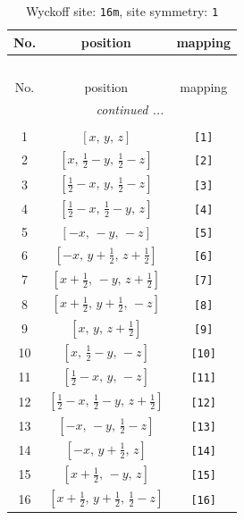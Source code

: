 \documentclass[fleqn,8pt]{jsarticle}
\begin{document}
\begin{longtable}{ccc}
\caption{Wyckoff site: {\tt 16m}, site symmetry: {\tt 1}}
 \\
 \hline \hline
No. & position & mapping \\ \hline \endfirsthead

\multicolumn{2}{l}{\tablename\ \thetable{}} \\
 \hline \hline
No. & position & mapping \\ \hline \endhead

 \hline \hline
\multicolumn{2}{r}{\footnotesize\it continued ...} \\ \endfoot

 \hline \hline
\multicolumn{2}{r}{} \\ \endlastfoot

1 & $\left[ x,\, y,\, z \right]$ & {\tt [1]} \\ \hline
2 & $\left[ x,\, \frac{1}{2} - y,\, \frac{1}{2} - z \right]$ & {\tt [2]} \\ \hline
3 & $\left[ \frac{1}{2} - x,\, y,\, \frac{1}{2} - z \right]$ & {\tt [3]} \\ \hline
4 & $\left[ \frac{1}{2} - x,\, \frac{1}{2} - y,\, z \right]$ & {\tt [4]} \\ \hline
5 & $\left[ - x,\, - y,\, - z \right]$ & {\tt [5]} \\ \hline
6 & $\left[ - x,\, y + \frac{1}{2},\, z + \frac{1}{2} \right]$ & {\tt [6]} \\ \hline
7 & $\left[ x + \frac{1}{2},\, - y,\, z + \frac{1}{2} \right]$ & {\tt [7]} \\ \hline
8 & $\left[ x + \frac{1}{2},\, y + \frac{1}{2},\, - z \right]$ & {\tt [8]} \\ \hline
9 & $\left[ x,\, y,\, z + \frac{1}{2} \right]$ & {\tt [9]} \\ \hline
10 & $\left[ x,\, \frac{1}{2} - y,\, - z \right]$ & {\tt [10]} \\ \hline
11 & $\left[ \frac{1}{2} - x,\, y,\, - z \right]$ & {\tt [11]} \\ \hline
12 & $\left[ \frac{1}{2} - x,\, \frac{1}{2} - y,\, z + \frac{1}{2} \right]$ & {\tt [12]} \\ \hline
13 & $\left[ - x,\, - y,\, \frac{1}{2} - z \right]$ & {\tt [13]} \\ \hline
14 & $\left[ - x,\, y + \frac{1}{2},\, z \right]$ & {\tt [14]} \\ \hline
15 & $\left[ x + \frac{1}{2},\, - y,\, z \right]$ & {\tt [15]} \\ \hline
16 & $\left[ x + \frac{1}{2},\, y + \frac{1}{2},\, \frac{1}{2} - z \right]$ & {\tt [16]} \\
\end{longtable}
\end{document}
